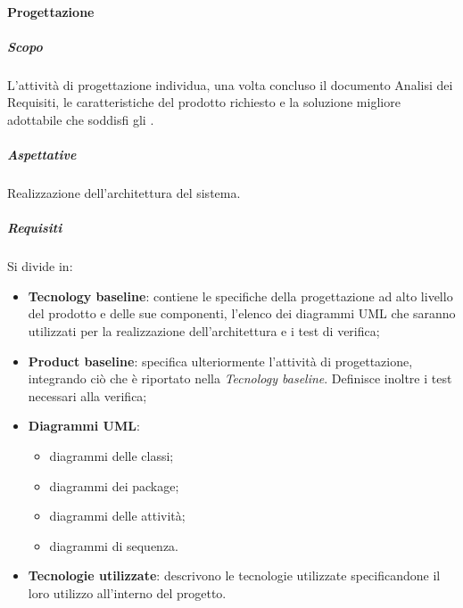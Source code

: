 			\paragraph{Progettazione}	
				\subparagraph{Scopo}
				L'attività di progettazione individua, una volta concluso il documento Analisi dei Requisiti, le caratteristiche del prodotto richiesto e la soluzione migliore adottabile che soddisfi gli . 
				\subparagraph{Aspettative}
				Realizzazione dell'architettura del sistema.
				\subparagraph{Requisiti}
				Si divide in:
				\begin{itemize}
					\item \textbf{Tecnology baseline}: contiene le specifiche della progettazione ad alto livello del prodotto e delle sue componenti, l'elenco dei diagrammi UML che saranno utilizzati per la realizzazione dell'architettura e i test di verifica;
					\item \textbf{Product baseline}: specifica ulteriormente l'attività di progettazione, integrando ciò che è riportato nella \textit{Tecnology baseline}. Definisce inoltre i test necessari alla verifica;
					\item \textbf{Diagrammi UML}:
					\begin{itemize}
						\item diagrammi delle classi;
						\item diagrammi dei package;
						\item diagrammi delle attività;
						\item diagrammi di sequenza.
					\end{itemize}
					\item \textbf{Tecnologie utilizzate}: descrivono le tecnologie utilizzate specificandone il loro utilizzo all'interno del progetto.
				\end{itemize}			
